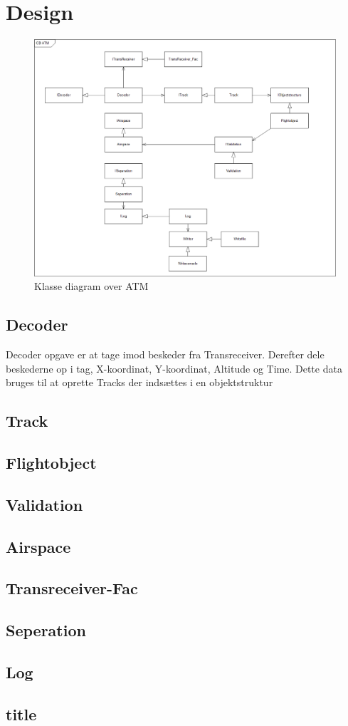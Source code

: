 \section{Design}
\begin{figure}[H]
	\centering
	\includegraphics[width=1\linewidth]{../Diagrammer/CD_ATM}
	\caption{Klasse diagram over ATM}
	\label{fig:cdatm}
\end{figure}

\subsection{Decoder}
Decoder opgave er at tage imod beskeder fra Transreceiver. Derefter dele beskederne op i tag, X-koordinat, Y-koordinat, Altitude og Time. Dette data bruges til at oprette Tracks der indsættes i en objektstruktur
\subsection{Track}

\subsection{Flightobject}

\subsection{Validation}

\subsection{Airspace}

\subsection{Transreceiver-Fac}

\subsection{Seperation}

\subsection{Log}

\subsection{title}